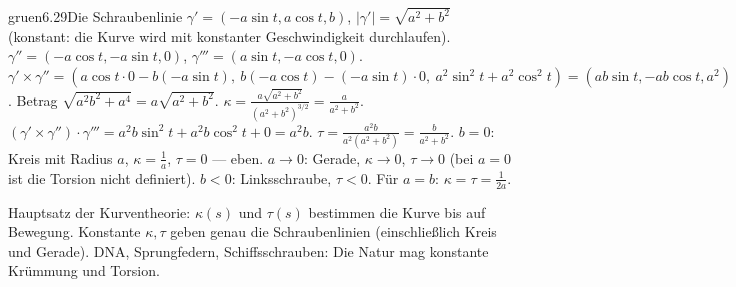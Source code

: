 \begin{loesungkarte}{gruen}{6.29}{Die Schraubenlinie}
$\gamma' = (-a\sin t, a\cos t, b)$, $|\gamma'| = \sqrt{a^{2} + b^{2}}$ (konstant: die Kurve wird mit konstanter Geschwindigkeit durchlaufen). $\gamma'' = (-a\cos t, -a\sin t, 0)$, $\gamma''' = (a\sin t, -a\cos t, 0)$.
$\gamma'\times\gamma'' = (a\cos t\cdot0 - b(-a\sin t),\ b(-a\cos t) - (-a\sin t)\cdot0,\ a^{2}\sin^{2}t + a^{2}\cos^{2}t) = (ab\sin t, -ab\cos t, a^{2})$. Betrag $\sqrt{a^{2}b^{2} + a^{4}} = a\sqrt{a^{2} + b^{2}}$. $\kappa = \frac{a\sqrt{a^{2} + b^{2}}}{(a^{2} + b^{2})^{3/2}} = \frac a{a^{2} + b^{2}}$.
$(\gamma'\times\gamma'')\cdot\gamma''' = a^{2}b\sin^{2}t + a^{2}b\cos^{2}t + 0 = a^{2}b$. $\tau = \frac{a^{2}b}{a^{2}(a^{2} + b^{2})} = \frac b{a^{2} + b^{2}}$.
$b = 0$: Kreis mit Radius $a$, $\kappa = \frac1a$, $\tau = 0$ --- eben. $a\to0$: Gerade, $\kappa\to0$, $\tau\to0$ (bei $a = 0$ ist die Torsion nicht definiert). $b < 0$: Linksschraube, $\tau < 0$. Für $a = b$: $\kappa = \tau = \frac1{2a}$.
\begin{mitnehmen}\kastentext
Hauptsatz der Kurventheorie: $\kappa(s)$ und $\tau(s)$ bestimmen die Kurve bis auf Bewegung. Konstante $\kappa, \tau$ geben genau die Schraubenlinien (einschließlich Kreis und Gerade). DNA, Sprungfedern, Schiffsschrauben: Die Natur mag konstante Krümmung und Torsion.
\end{mitnehmen}
\end{loesungkarte}

